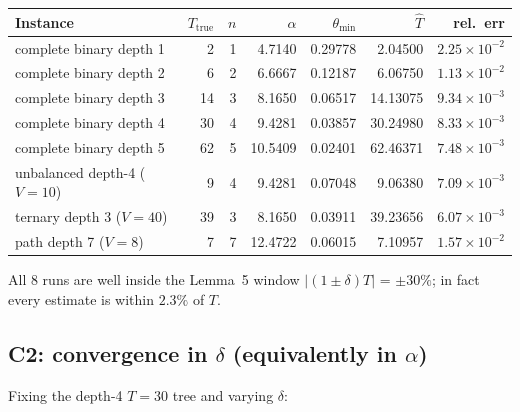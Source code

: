 \documentclass[11pt]{article}
\begin{document}
\begin{table}[ht]
\centering
\small
\begin{tabular}{lrrrrrr}
\toprule
Instance & $T_{\text{true}}$ & $n$ & $\alpha$ & $\theta_{\min}$ & $\hat T$ & rel.\ err \\
\midrule
complete binary depth 1 &  2 & 1 &  4.7140 & 0.29778 &   2.04500 & $2.25\!\times\!10^{-2}$ \\
complete binary depth 2 &  6 & 2 &  6.6667 & 0.12187 &   6.06750 & $1.13\!\times\!10^{-2}$ \\
complete binary depth 3 & 14 & 3 &  8.1650 & 0.06517 &  14.13075 & $9.34\!\times\!10^{-3}$ \\
complete binary depth 4 & 30 & 4 &  9.4281 & 0.03857 &  30.24980 & $8.33\!\times\!10^{-3}$ \\
complete binary depth 5 & 62 & 5 & 10.5409 & 0.02401 &  62.46371 & $7.48\!\times\!10^{-3}$ \\
unbalanced depth-4 ($V{=}10$) & 9 & 4 &  9.4281 & 0.07048 &   9.06380 & $7.09\!\times\!10^{-3}$ \\
ternary depth 3 ($V{=}40$)    & 39 & 3 &  8.1650 & 0.03911 &  39.23656 & $6.07\!\times\!10^{-3}$ \\
path depth 7 ($V{=}8$)        & 7  & 7 & 12.4722 & 0.06015 &   7.10957 & $1.57\!\times\!10^{-2}$ \\
\bottomrule
\end{tabular}
\end{table}
All 8 runs are well inside the Lemma~5 window $|(1\pm\delta)T|$ = $\pm30\%$;
in fact every estimate is within $2.3\%$ of $T$.

\subsection*{C2: convergence in $\delta$ (equivalently in $\alpha$)}
Fixing the depth-4 $T{=}30$ tree and varying $\delta$:
\end{document}
